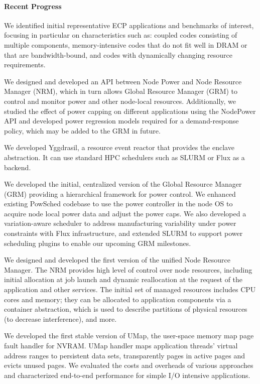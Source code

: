 \paragraph{Recent Progress}

We identified initial representative ECP applications and benchmarks of
interest, focusing in particular on characteristics such as: coupled codes
consisting of multiple components, memory-intensive codes that do not fit
well in DRAM or that are bandwidth-bound, and codes with dynamically
changing resource requirements.

We designed and developed an API between Node Power and Node
Resource Manager (NRM), which in turn allows Global Resource
Manager (GRM) to control and monitor power and other node-local
resources. Additionally, we studied the effect of power capping on
different applications using the NodePower API and developed power
regression models required for a demand-response policy, which may be
added to the GRM in future.

We developed Yggdrasil, a resource event reactor that provides the enclave
abstraction.  It can use standard HPC schedulers such as SLURM or Flux as a
backend.

We developed the initial, centralized version of the Global Resource
Manager (GRM) providing a hierarchical framework for power control.  We
enhanced existing PowSched codebase to use the power controller in the node
OS to acquire node local power data and adjust the power caps. We also developed a variation-aware
scheduler to address manufacturing variability under power constraints with Flux infrastructure, 
and extended SLURM to support power scheduling plugins to enable our upcoming GRM 
milestones. 

We designed and developed the first version of the unified Node
Resource Manager.  The NRM provides high level of control over node
resources, including initial allocation at job launch and dynamic
reallocation at the request of the application and other services.
The initial set of
managed resources includes CPU cores and memory; they can be allocated to
application components via a container abstraction, which is used to describe
partitions of physical resources (to decrease interference),
and more.

We developed the first stable version of UMap, the user-space memory map
page fault handler for NVRAM. 
UMap handler maps application
threads' virtual address ranges to persistent data sets, transparently
pages in active pages and evicts unused pages.  We evaluated the costs and
overheads of various approaches and characterized end-to-end performance
for simple I/O intensive applications.

